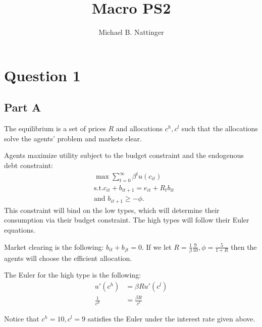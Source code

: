 \documentclass[11pt]{article} %
\title{Macro PS2}
\author{Michael B. Nattinger}
\begin{document}
\maketitle
\section{Question 1}
\subsection{Part A}
%
The equilibrium is a set of prices $R$ and allocations $c^h,c^l$ such that the allocations solve the agents' problem and markets clear.

Agents maximize utility subject to the budget constraint and the endogenous debt constraint:
\begin{align*}
&\max \sum_{t=0}^{\infty} \beta^t u(c_{it})\\
&\text{s.t.} c_{it} + b_{it+1} = e_{it} + R_tb_{it}\\
&\text{and } b_{it+1} \geq -\phi.
\end{align*}
This constraint will bind on the low types, which will determine their consumption via their budget constraint. The high types will follow their Euler equations.

Market clearing is the following: $b_{it} + b_{jt} = 0$. If we let $R = \frac{1}{\beta}\frac{9}{10},\phi = \frac{5}{1+R}$ then the agents will choose the efficient allocation.

The Euler for the high type is the following:
\begin{align*}
u'(c^h) &= \beta R u'(c^l)\\
\frac{1}{c^h} &= \frac{\beta R}{c^l}
\end{align*}

Notice that $c^h = 10,c^l = 9 $ satisfies the Euler under the interest rate given above.
\end{document}
